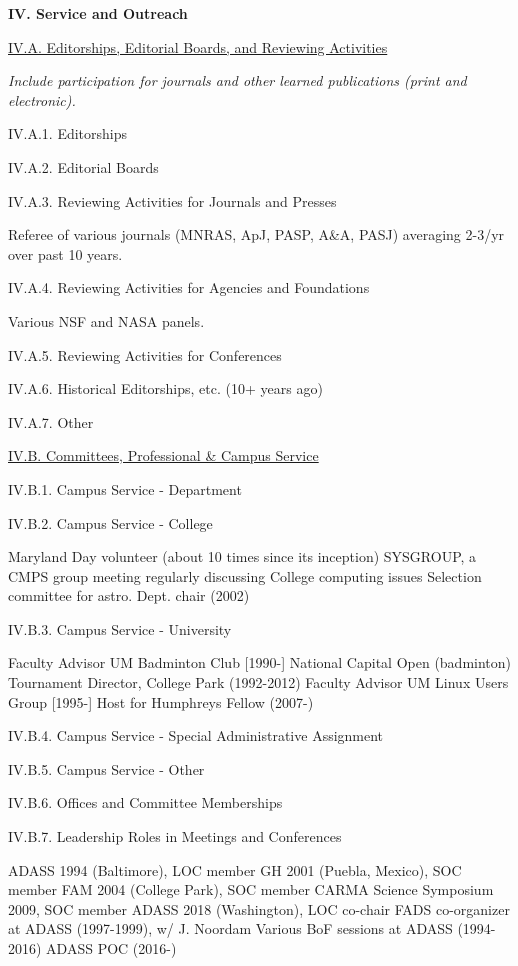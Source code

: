 \documentclass[11pt,letterpaper]{article}
\newcommand{\newi}{\newline\indent}
\begin{document}
\textbf{IV. Service and Outreach}


\underline{IV.A. Editorships, Editorial Boards, and Reviewing Activities}

\textit{Include participation for journals and other learned publications (print and electronic).}

IV.A.1. Editorships

IV.A.2. Editorial Boards

IV.A.3. Reviewing Activities for Journals and Presses

Referee of various journals (MNRAS, ApJ, PASP, A\&A, PASJ) averaging 2-3/yr over past 10 years.


IV.A.4. Reviewing Activities for Agencies and Foundations

Various NSF and NASA panels.

IV.A.5. Reviewing Activities for Conferences

IV.A.6. Historical Editorships, etc. (10+ years ago)

IV.A.7. Other


\underline{IV.B. Committees, Professional \& Campus Service}

IV.B.1. Campus Service - Department

IV.B.2. Campus Service - College

Maryland Day volunteer (about 10 times since its inception)\newi
SYSGROUP, a CMPS group meeting regularly discussing College computing issues\newi
Selection committee for astro. Dept. chair (2002)\newi

IV.B.3. Campus Service - University
                
Faculty Advisor UM Badminton Club [1990-]\newi
National Capital Open  (badminton) Tournament Director, College Park (1992-2012)\newi
Faculty Advisor UM Linux Users Group [1995-]\newi
Host for Humphreys Fellow (2007-)\newi

IV.B.4. Campus Service - Special Administrative Assignment

IV.B.5. Campus Service - Other

IV.B.6. Offices and Committee Memberships 

IV.B.7. Leadership Roles in Meetings and Conferences

ADASS 1994 (Baltimore), LOC member\newi
GH 2001 (Puebla, Mexico), SOC member\newi
FAM 2004 (College Park), SOC member\newi
CARMA Science Symposium 2009, SOC member\newi
ADASS 2018 (Washington), LOC co-chair\newi
FADS co-organizer at ADASS (1997-1999), w/ J. Noordam\newi
Various BoF sessions at ADASS (1994-2016)\newi      
ADASS POC (2016-)\newi
\end{document}
